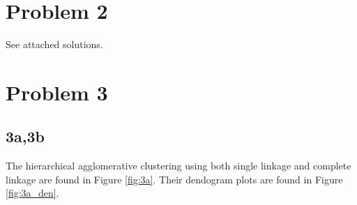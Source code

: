 \documentclass[12pt]{article}
\begin{document}
\newpage

\section*{Problem 2}

See attached solutions.



\section*{Problem 3}

\subsection*{3a,3b}

The hierarchical agglomerative clustering using both single linkage and complete linkage are found in Figure \ref{fig:3a}. Their dendogram plots are found in Figure \ref{fig:3a_den}.
\end{document}
